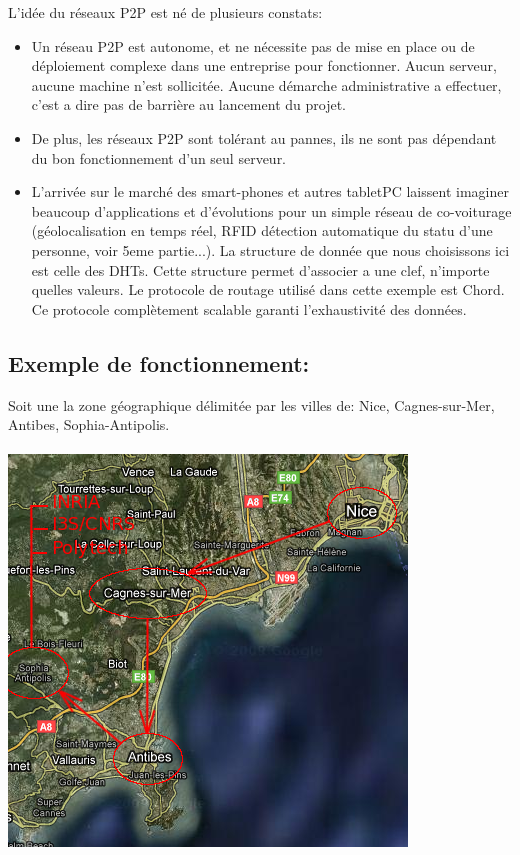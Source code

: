 L'idée du réseaux P2P est né de plusieurs constats: 
\begin{itemize}
\item Un réseau P2P est autonome, et ne nécessite pas de mise en place ou de déploiement complexe dans une entreprise pour fonctionner. Aucun serveur, aucune machine n'est sollicitée. Aucune démarche administrative a effectuer, c'est a dire pas de barrière au lancement du projet.
\item De plus, les réseaux P2P sont tolérant au pannes, ils ne sont pas dépendant du bon fonctionnement d'un seul serveur.
\item L'arrivée sur le marché des smart-phones et autres tabletPC laissent imaginer beaucoup d'applications et d'évolutions pour un simple réseau de co-voiturage (géolocalisation en temps réel, RFID détection automatique du statu d'une personne, voir 5eme partie...).
La structure de donnée que nous choisissons ici est celle des DHTs. Cette structure permet d'associer a une clef, n'importe quelles valeurs. Le protocole de routage utilisé dans cette exemple est Chord. Ce protocole complètement scalable garanti l'exhaustivité des données. \\
\end{itemize}

\clearpage

\subsection{Exemple de fonctionnement: }
Soit une la zone géographique délimitée par les villes de: Nice, Cagnes-sur-Mer, Antibes, Sophia-Antipolis. \\

~~~~~~~~~~~~~~~~~~~~ \includegraphics[scale=0.7]{img/screenshot/geolock2}\\


